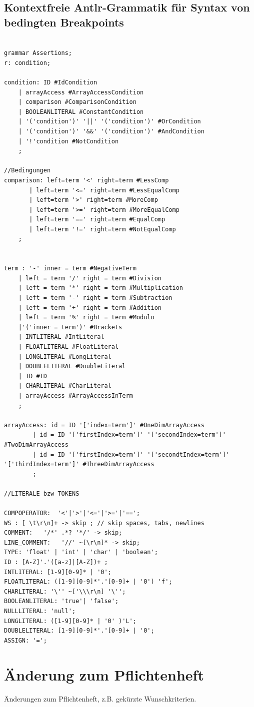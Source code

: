 \documentclass[parskip=full]{scrartcl}
\begin{document}
\subsection{Kontextfreie Antlr-Grammatik für Syntax von bedingten Breakpoints}
\begin{verbatim}

grammar Assertions;
r: condition;

condition: ID #IdCondition
	| arrayAccess #ArrayAccessCondition
	| comparison #ComparisonCondition
	| BOOLEANLITERAL #ConstantCondition
	| '('condition')' '||' '('condition')' #OrCondition
	| '('condition')' '&&' '('condition')' #AndCondition
	| '!'condition #NotCondition
	;

//Bedingungen
comparison: left=term '<' right=term #LessComp
	   | left=term '<=' right=term #LessEqualComp
	   | left=term '>' right=term #MoreComp
	   | left=term '>=' right=term #MoreEqualComp
	   | left=term '==' right=term #EqualComp
	   | left=term '!=' right=term #NotEqualComp
	;


term : '-' inner = term #NegativeTerm
    | left = term '/' right = term #Division
	| left = term '*' right = term #Multiplication
	| left = term '-' right = term #Subtraction
	| left = term '+' right = term #Addition
	| left = term '%' right = term #Modulo
	|'('inner = term')' #Brackets
    | INTLITERAL #IntLiteral
	| FLOATLITERAL #FloatLiteral
	| LONGLITERAL #LongLiteral
	| DOUBLELITERAL #DoubleLiteral
	| ID #ID
	| CHARLITERAL #CharLiteral
	| arrayAccess #ArrayAccessInTerm
	;

arrayAccess: id = ID '['index=term']' #OneDimArrayAccess
		| id = ID '['firstIndex=term']' '['secondIndex=term']' #TwoDimArrayAccess
		| id = ID '['firstIndex=term']' '['secondtIndex=term']' '['thirdIndex=term']' #ThreeDimArrayAccess
		;

//LITERALE bzw TOKENS

COMPOPERATOR:  '<'|'>'|'<='|'>='|'==';
WS : [ \t\r\n]+ -> skip ; // skip spaces, tabs, newlines
COMMENT:   '/*' .*? '*/' -> skip;
LINE_COMMENT:   '//' ~[\r\n]* -> skip;
TYPE: 'float' | 'int' | 'char' | 'boolean';
ID : [A-Z]'.'([a-z]|[A-Z])+ ;
INTLITERAL: [1-9][0-9]* | '0';
FLOATLITERAL: ([1-9][0-9]*'.'[0-9]+ | '0') 'f';
CHARLITERAL: '\'' ~['\\\r\n] '\'';
BOOLEANLITERAL:	'true'|	'false';
NULLLITERAL: 'null';
LONGLITERAL: ([1-9][0-9]* | '0' )'L';
DOUBLELITERAL: [1-9][0-9]*'.'[0-9]+ | '0';
ASSIGN: '=';

\end{verbatim}
\section{Änderung zum Pflichtenheft}
Änderungen zum Pflichtenheft, z.B. gekürzte Wunschkriterien.
\end{document}
